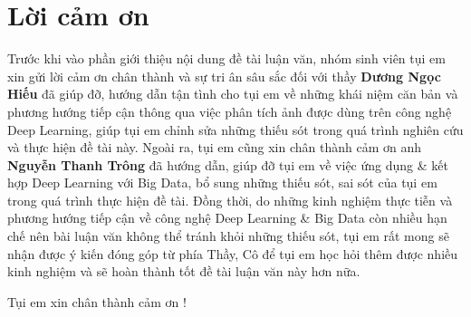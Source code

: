 \documentclass[12pt]{report}
\begin{document}
\chapter*{Lời cảm ơn}
Trước khi vào phần giới thiệu nội dung đề tài luận văn, nhóm sinh viên tụi em xin gửi lời cảm ơn chân thành và sự tri ân sâu sắc đối với thầy \textbf{Dương Ngọc Hiếu} đã giúp đỡ, hướng dẫn tận tình cho tụi em về những khái niệm căn bản và phương hướng tiếp cận thông qua việc phân tích ảnh được dùng trên công nghệ Deep Learning, giúp tụi em chỉnh sửa những thiếu sót trong quá trình nghiên cứu và thực hiện đề tài này. Ngoài ra, tụi em cũng xin chân thành cảm ơn anh \textbf{Nguyễn Thanh Trông} đã hướng dẫn, giúp đỡ tụi em về việc ứng dụng \& kết hợp Deep Learning với Big Data, bổ sung những thiếu sót, sai sót của tụi em trong quá trình thực hiện đề tài. Đồng thời, do những kinh nghiệm thực tiễn và phương hướng tiếp cận về công nghệ Deep Learning \& Big Data còn nhiều hạn chế nên bài luận văn không thể tránh khỏi những thiếu sót, tụi em rất mong sẽ nhận được ý kiến đóng góp từ phía Thầy, Cô để tụi em học hỏi thêm được nhiều kinh nghiệm và sẽ hoàn thành tốt đề tài luận văn này hơn nữa.
\begin{flushright}
Tụi em xin chân thành cảm ơn ! 
\end{flushright}
%
\newpage\cleardoublepage
\newpage\cleardoublepage
\newpage\cleardoublepage
\newpage\cleardoublepage
\newpage\cleardoublepage
\newpage\cleardoublepage
\newpage\cleardoublepage
\nocite{*}

\newpage\cleardoublepage

\end{document}
